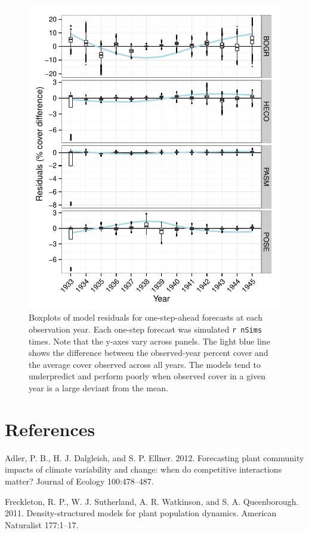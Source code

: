 \documentclass[author-year, 12pt,review]{components/elsarticle} %
\makeatletter
\def\maxwidth{\ifdim\Gin@nat@width>\linewidth\linewidth
\else\Gin@nat@width\fi}
\let\Oldincludegraphics\includegraphics
\renewcommand{\includegraphics}[1]{\Oldincludegraphics[width=\maxwidth]{#1}}
\makeatother
\begin{document}
\begin{figure}[htbp]
\centering
\includegraphics{components/figure/manuscript-figure_3.pdf}
\caption{Boxplots of model residuals for one-step-ahead forecasts at
each observation year. Each one-step forecast was simulated
\texttt{r nSims} times. Note that the y-axes vary across panels. The
light blue line shows the difference between the observed-year percent
cover and the average cover observed across all years. The models tend
to underpredict and perform poorly when observed cover in a given year
is a large deviant from the mean.}
\end{figure}

\section{References}\label{references}

Adler, P. B., H. J. Dalgleish, and S. P. Ellner. 2012. Forecasting plant
community impacts of climate variability and change: when do competitive
interactions matter? Journal of Ecology 100:478--487.

Freckleton, R. P., W. J. Sutherland, A. R. Watkinson, and S. A.
Queenborough. 2011. Density-structured models for plant population
dynamics. American Naturalist 177:1--17.
\end{document}

